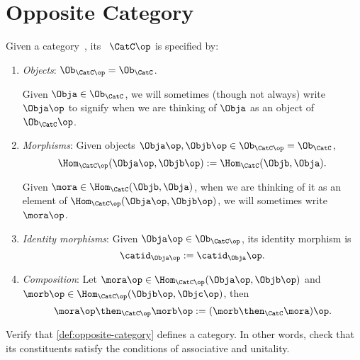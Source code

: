 \section{Opposite Category}


\begin{ctdefinition}\label{def:opposite-category}
  \label{def:oppositecat}
 Given a category~\CatC, its \emph{}~$\CatC\op$ is specified by:
 \begin{enumerate}
 \item \emph{Objects}: $\Ob_{\CatC\op} = \Ob_\CatC$. 
 
 Given $\Obja \in  \Ob_\CatC$, we will sometimes (though not always) write $\Obja\op$ to signify when we are thinking of $\Obja$ as an object of $\Ob_\CatC\op$.
 
 \item \emph{Morphisms}: Given objects $\Obja\op,  \Objb\op \in \Ob_{\CatC\op} = \Ob_\CatC$, 
 \begin{equation}\label{eq:homset-op-cat}
\Hom_{\CatC\op}(\Obja\op, \Objb\op) := \Hom_{\CatC}(\Objb, \Obja).
\end{equation}

Given $\mora \in \Hom_{\CatC}(\Objb, \Obja)$, when we are thinking of it as an element of $\Hom_{\CatC\op}(\Obja\op, \Objb\op)$, we will sometimes write $\mora\op$. 

 \item \emph{Identity morphisms}: Given $\Obja\op \in \Ob_{\CatC\op}$, its identity morphism is 
 \begin{equation}
\catid_{\Obja\op} := \catid_{\Obja}\op.
\end{equation}

 \item \emph{Composition}: Let $\mora\op \in \Hom_{\CatC\op}(\Obja\op, \Objb\op)$ and $\morb\op \in \Hom_{\CatC\op}(\Objb\op, \Objc\op)$, then 
 \begin{equation}
\mora\op \then_{\CatC\op} \morb\op := (\morb \then_\CatC \mora)\op.
\end{equation}
\end{enumerate}
\end{ctdefinition}

\begin{gradedexercise}
Verify that \cref{def:opposite-category} defines a category. In other words, check that its constituents satisfy the conditions of associative and unitality. 
\end{gradedexercise}

